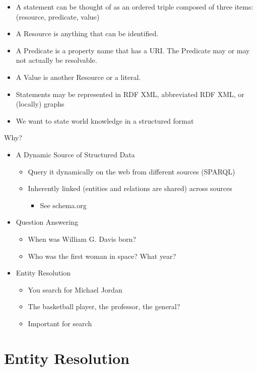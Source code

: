\documentclass[11pt]{article}
\theoremstyle{definition}
\begin{document}
\begin{itemize}
    \item A statement can be thought of as an ordered triple composed of three items:
    (resource, predicate, value)
    \item A Resource is anything that can be identified.
    \item A Predicate is a property name that has a URI. The Predicate may or may not
    actually be resolvable.
    \item A Value is another Resource or a literal.
    \item Statements may be represented in RDF XML, abbreviated RDF XML,
    or (locally) graphs
    \item We want to state world knowledge in a structured format
\end{itemize}

Why?

\begin{itemize}
    \item A Dynamic Source of Structured Data
    \begin{itemize}
        \item Query it dynamically on the web from different sources (SPARQL)
        \item Inherently linked (entities and relations are shared) across sources
        \begin{itemize}
            \item See schema.org
        \end{itemize}
    \end{itemize}
    \item Question Answering
    \begin{itemize}
        \item When was William G. Davis born?
        \item Who was the first woman in space? What year?
    \end{itemize}
    \item Entity Resolution
    \begin{itemize}
        \item You search for Michael Jordan
        \item The basketball player, the professor, the general?
        \item Important for search
    \end{itemize}
\end{itemize}

\section{Entity Resolution}
\end{document}
